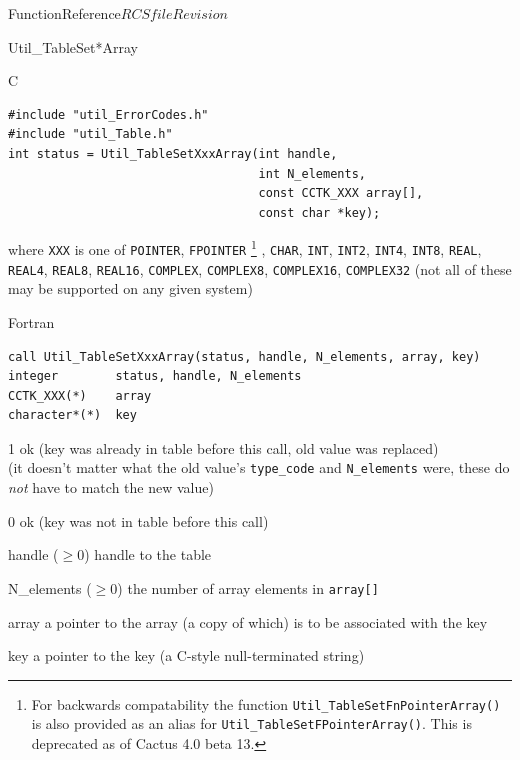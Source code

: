\begin{cactuspart}{FunctionReference}{$RCSfile$}{$Revision$}
\begin{FunctionDescription}{Util\_TableSet*Array}
\begin{SynopsisSection}
\begin{Synopsis}{C}
\begin{verbatim}
#include "util_ErrorCodes.h"
#include "util_Table.h"
int status = Util_TableSetXxxArray(int handle,
                                   int N_elements,
                                   const CCTK_XXX array[],
                                   const char *key);
\end{verbatim}
where \verb|XXX| is one of
   \verb|POINTER|, \verb|FPOINTER|%
\footnote{%
	 For backwards compatability the function
	 {\tt Util\_TableSetFnPointerArray()} is also provided
	 as an alias for {\tt Util\_TableSetFPointerArray()}.
	 This is deprecated as of Cactus 4.0 beta 13.
	 }%
,
   \verb|CHAR|,
   \verb|INT|, \verb|INT2|, \verb|INT4|, \verb|INT8|,
   \verb|REAL|, \verb|REAL4|, \verb|REAL8|, \verb|REAL16|,
   \verb|COMPLEX|, \verb|COMPLEX8|, \verb|COMPLEX16|, \verb|COMPLEX32|
(not all of these may be supported on any given system)
\end{Synopsis}
\begin{Synopsis}{Fortran}
\begin{verbatim}
call Util_TableSetXxxArray(status, handle, N_elements, array, key)
integer        status, handle, N_elements
CCTK_XXX(*)    array
character*(*)  key
\end{verbatim}
\end{Synopsis}
\end{SynopsisSection}

\begin{ResultSection}
\begin{Result}{\rm 1}
ok (key was already in table before this call, old value was replaced)\\
   (it doesn't matter what the old value's \verb|type_code| and
    \verb|N_elements| were, \ie{} these do {\em not\/} have to match
    the new value)
\end{Result}
\begin{Result}{\rm 0}
ok (key was not in table before this call)
\end{Result}
\end{ResultSection}

\begin{ParameterSection}
\begin{Parameter}{handle ($\ge 0$)}
handle to the table
\end{Parameter}
\begin{Parameter}{N\_elements ($\ge 0$)}
the number of array elements in \verb|array[]|
\end{Parameter}
\begin{Parameter}{array}
a pointer to the array (a copy of which) is to be associated with the key
\end{Parameter}
\begin{Parameter}{key}
a pointer to the key (a C-style null-terminated string)
\end{Parameter}
\end{ParameterSection}


\end{FunctionDescription}
\end{cactuspart}
